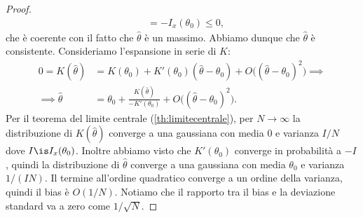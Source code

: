\begin{proof}
\begin{align*}
		&= -I_x(\theta_0)
		\le 0,
	\end{align*}
	che è coerente con il fatto che $\hat\theta$ è un massimo.
	Abbiamo dunque che $\hat\theta$ è consistente.
	Consideriamo l'espansione in serie di $K$:
	\begin{align*}
		0 = K(\hat\theta)
		&= K(\theta_0) + K'(\theta_0)(\hat\theta-\theta_0) + O\big((\hat\theta-\theta_0)^2\big) \implies \\
		\implies \hat\theta
		&= \theta_0 + \frac{K(\hat\theta)}{-K'(\theta_0)} + O\big((\hat\theta-\theta_0)^2\big).
	\end{align*}
	Per il teorema del limite centrale (\autoref{th:limitecentrale}),
	per $N\to\infty$
	la distribuzione di $K(\hat\theta)$ converge a una gaussiana
	con media 0 e varianza $I/N$ dove $I\is I_x(\theta_0)$.
	Inoltre abbiamo visto che $K'(\theta_0)$ converge in probabilità a $-I$,
	quindi la distribuzione di $\hat\theta$ converge a una gaussiana
	con media $\theta_0$ e varianza $1/(IN)$.
	Il termine all'ordine quadratico converge a un ordine della varianza,
	quindi il bias è $O(1/N)$.
	Notiamo che il rapporto tra il bias e la deviazione standard va a zero come $1/\sqrt{N}$.
\end{proof}

